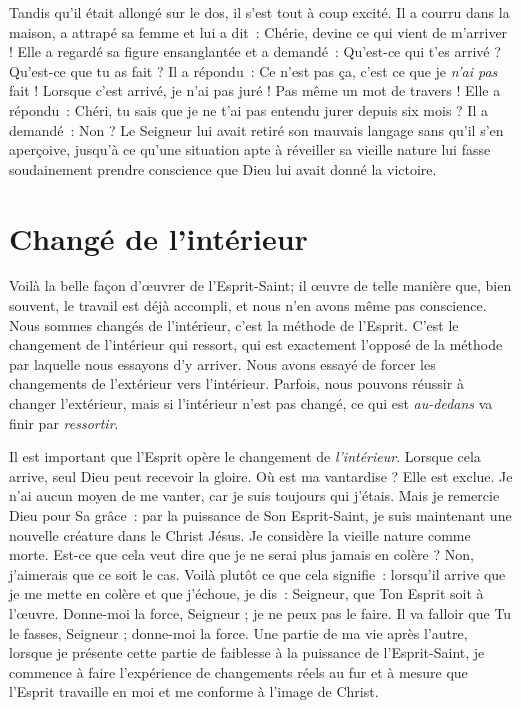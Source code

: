 Tandis qu'il était allongé sur le dos, il s'est tout à coup excité.
 Il a courru dans la maison, a attrapé sa femme et lui a dit~:
 \og Chérie, devine ce qui vient de m'arriver ! \fg{}
 Elle a regardé sa figure ensanglantée et a demandé~:
 \og Qu'est-ce qui t'es arrivé ? Qu'est-ce que tu as fait ? \fg{}
 Il a répondu~:
 \og Ce n'est pas ça, c'est ce que je \emph{n'ai pas} fait !
 Lorsque c'est arrivé, je n'ai pas juré ! Pas même un mot de travers ! \fg{}
 Elle a répondu~:
 \og Chéri, tu sais que je ne t'ai pas entendu jurer depuis six mois ? \fg{}
 Il a demandé~: \og Non ? \fg{}
 Le Seigneur lui avait retiré son mauvais langage sans qu'il s'en aperçoive,
 jusqu'à ce qu'une situation apte à réveiller sa vieille nature
 lui fasse soudainement prendre conscience
 que Dieu lui avait donné la victoire.


\section{Chang\'e de l'int\'erieur}

Voilà la belle façon d'œuvrer de l'Esprit-Saint;
 il \oe{}uvre de telle manière que, bien souvent,
 le travail est déjà accompli, et nous n'en avons même pas conscience.
 Nous sommes changés de l'intérieur, c'est la méthode de l'Esprit.
 C'est le changement de l'intérieur qui ressort,
 qui est exactement l'opposé de la méthode par laquelle
 nous essayons d'y arriver.
 Nous avons essayé de forcer les changements de l'extérieur
 vers l'intérieur.
 Parfois, nous pouvons réussir à changer l'extérieur,
 mais si l'intérieur n'est pas changé,
 ce qui est \emph{au-dedans} va finir par \emph{ressortir}.

Il est important que l'Esprit opère le changement de \emph{l'intérieur}.
 Lorsque cela arrive, seul Dieu peut recevoir la gloire.
 Où est ma vantardise ? Elle est exclue.
 Je n'ai aucun moyen de me vanter, car je suis toujours qui j'étais.
 Mais je remercie Dieu pour Sa grâce~: par la puissance de Son Esprit-Saint,
 je suis maintenant une nouvelle créature dans le Christ Jésus.
 Je considère la vieille nature comme morte.
 Est-ce que cela veut dire que je ne serai plus jamais en colère ?
 Non, j'aimerais que ce soit le cas.
 Voilà plutôt ce que cela signifie~: lorsqu'il arrive que je me mette en colère
 et que j'échoue, je dis~:
 \og Seigneur, que Ton Esprit soit à l'œuvre. Donne-moi la force,
 Seigneur ; je ne peux pas le faire. Il va falloir que Tu le fasses,
 Seigneur ; donne-moi la force. \fg{}
 Une partie de ma vie après l'autre, lorsque je présente cette partie
 de faiblesse à la puissance de l'Esprit-Saint, je commence à faire
 l'expérience de changements réels au fur et à mesure que l'Esprit travaille en moi
 et me conforme à l'image de Christ.


